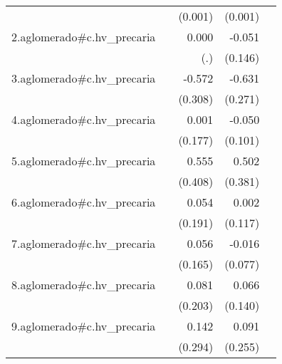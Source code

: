 {\begin{longtable}{l*{4}{D{.}{.}{-1}}}
            &                     &     (0.001)         &     (0.001)         &                     \\
\addlinespace
2.aglomerado#c.hv\_precaria&                     &       0.000         &      -0.051         &                     \\
            &                     &         (.)         &     (0.146)         &                     \\
\addlinespace
3.aglomerado#c.hv\_precaria&                     &      -0.572         &      -0.631\sym{*}  &                     \\
            &                     &     (0.308)         &     (0.271)         &                     \\
\addlinespace
4.aglomerado#c.hv\_precaria&                     &       0.001         &      -0.050         &                     \\
            &                     &     (0.177)         &     (0.101)         &                     \\
\addlinespace
5.aglomerado#c.hv\_precaria&                     &       0.555         &       0.502         &                     \\
            &                     &     (0.408)         &     (0.381)         &                     \\
\addlinespace
6.aglomerado#c.hv\_precaria&                     &       0.054         &       0.002         &                     \\
            &                     &     (0.191)         &     (0.117)         &                     \\
\addlinespace
7.aglomerado#c.hv\_precaria&                     &       0.056         &      -0.016         &                     \\
            &                     &     (0.165)         &     (0.077)         &                     \\
\addlinespace
8.aglomerado#c.hv\_precaria&                     &       0.081         &       0.066         &                     \\
            &                     &     (0.203)         &     (0.140)         &                     \\
\addlinespace
9.aglomerado#c.hv\_precaria&                     &       0.142         &       0.091         &                     \\
            &                     &     (0.294)         &     (0.255)         &                     \\

\end{longtable}}
